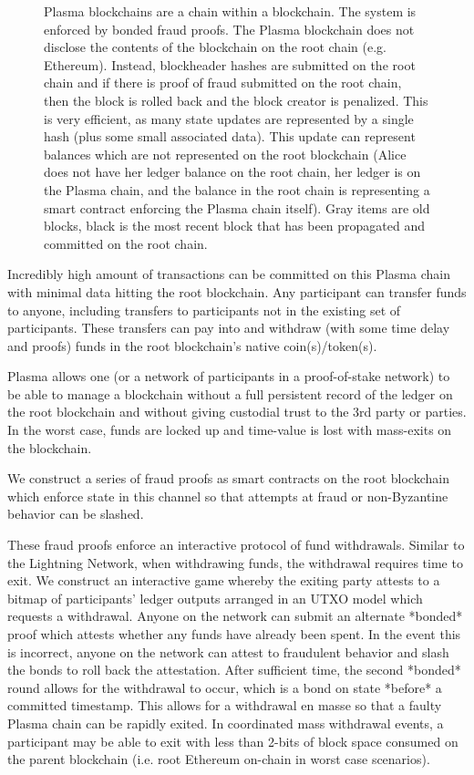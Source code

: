 \documentclass[letterpaper, 11pt]{article}
\begin{document}
\begin{figure}[H]
	\caption{
		Plasma blockchains are a chain within a blockchain. The system
		is enforced by bonded fraud proofs. The Plasma blockchain does
		not disclose the contents of the blockchain on the root chain
		(e.g. Ethereum). Instead, blockheader hashes are submitted on
		the root chain and if there is proof of fraud submitted on the
		root chain, then the block is rolled back and the block creator
		is penalized. This is very efficient, as many state updates are
		represented by a single hash (plus some small associated data).
		This update can represent balances which are not represented on
		the root blockchain (Alice does not have her ledger balance on
		the root chain, her ledger is on the Plasma chain, and the
		balance in the root chain is representing a smart contract
		enforcing the Plasma chain itself). Gray items are old blocks,
		black is the most recent block that has been propagated and
		committed on the root chain.
	}
\end{figure}

Incredibly high amount of transactions can be committed on this Plasma chain
with minimal data hitting the root blockchain. Any participant can transfer
funds to anyone, including transfers to participants not in the existing set of
participants. These transfers can pay into and withdraw (with some time delay
and proofs) funds in the root blockchain's native coin(s)/token(s).

Plasma allows one (or a network of participants in a proof-of-stake network) to
be able to manage a blockchain without a full persistent record of the ledger on
the root blockchain and without giving custodial trust to the 3rd party or
parties. In the worst case, funds are locked up and time-value is lost with
mass-exits on the blockchain.

We construct a series of fraud proofs as smart contracts\cite{smartcontracts}
on the root blockchain which enforce state in this channel so that attempts at
fraud or non-Byzantine behavior can be slashed.

These fraud proofs enforce an interactive protocol of fund withdrawals. Similar
to the Lightning Network, when withdrawing funds, the withdrawal requires time
to exit. We construct an interactive game whereby the exiting party attests to a
bitmap of participants' ledger outputs arranged in an UTXO model which
requests a withdrawal. Anyone on the network can submit an alternate *bonded*
proof which attests whether any funds have already been spent. In the event this
is incorrect, anyone on the network can attest to fraudulent behavior and slash
the bonds to roll back the attestation. After sufficient time, the second
*bonded* round allows for the withdrawal to occur, which is a bond on state
*before* a committed timestamp. This allows for a withdrawal en masse so that a
faulty Plasma chain can be rapidly exited. In coordinated mass withdrawal
events, a participant may be able to exit with less than 2-bits of block space
consumed on the parent blockchain (i.e. root Ethereum on-chain in worst case
scenarios).
\end{document}
